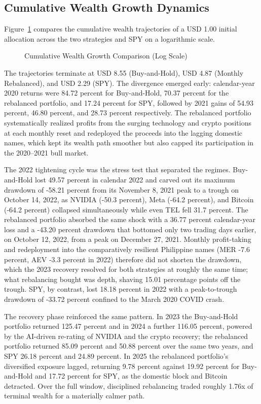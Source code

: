 \subsection{Cumulative Wealth Growth Dynamics}

Figure~\ref{fig:portfolio_growth} compares the cumulative wealth trajectories of a USD 1.00 initial allocation across the two strategies and SPY on a logarithmic scale.

\begin{figure}[H]
  \centering
  \caption{Cumulative Wealth Growth Comparison (Log Scale)}
  \label{fig:portfolio_growth}
\end{figure}

The trajectories terminate at USD 8.55 (Buy-and-Hold), USD 4.87 (Monthly Rebalanced), and USD 2.29 (SPY). The divergence emerged early: calendar-year 2020 returns were 84.72 percent for Buy-and-Hold, 70.37 percent for the rebalanced portfolio, and 17.24 percent for SPY, followed by 2021 gains of 54.93 percent, 46.80 percent, and 28.73 percent respectively. The rebalanced portfolio systematically realized profits from the surging technology and crypto positions at each monthly reset and redeployed the proceeds into the lagging domestic names, which kept its wealth path smoother but also capped its participation in the 2020--2021 bull market.

The 2022 tightening cycle was the stress test that separated the regimes. Buy-and-Hold lost 49.57 percent in calendar 2022 and carved out its maximum drawdown of -58.21 percent from its November 8, 2021 peak to a trough on October 14, 2022, as NVIDIA (-50.3 percent), Meta (-64.2 percent), and Bitcoin (-64.2 percent) collapsed simultaneously while even TEL fell 31.7 percent. The rebalanced portfolio absorbed the same shock with a 36.77 percent calendar-year loss and a -43.20 percent drawdown that bottomed only two trading days earlier, on October 12, 2022, from a peak on December 27, 2021. Monthly profit-taking and redeployment into the comparatively resilient Philippine names (MER -7.6 percent, AEV -3.3 percent in 2022) therefore did not shorten the drawdown, which the 2023 recovery resolved for both strategies at roughly the same time; what rebalancing bought was depth, shaving 15.01 percentage points off the trough. SPY, by contrast, lost 18.18 percent in 2022 with a peak-to-trough drawdown of -33.72 percent confined to the March 2020 COVID crash.

The recovery phase reinforced the same pattern. In 2023 the Buy-and-Hold portfolio returned 125.47 percent and in 2024 a further 116.05 percent, powered by the AI-driven re-rating of NVIDIA and the crypto recovery; the rebalanced portfolio returned 85.09 percent and 50.88 percent over the same two years, and SPY 26.18 percent and 24.89 percent. In 2025 the rebalanced portfolio's diversified exposure lagged, returning 9.78 percent against 19.92 percent for Buy-and-Hold and 17.72 percent for SPY, as the domestic block and Bitcoin detracted. Over the full window, disciplined rebalancing traded roughly 1.76x of terminal wealth for a materially calmer path.

